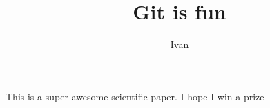 \documentclass[10pt]{article}
\author{Ivan}
\title{Git is fun}
\begin{document}
        \maketitle

	This is a super awesome scientific paper.
	I hope I win a prize
\end{document}
